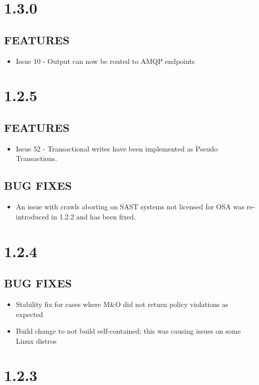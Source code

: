 \section{1.3.0}
\subsection*{FEATURES}
    \begin{itemize}
        \item Issue 10 - Output can now be routed to AMQP endpoints
    \end{itemize}


\section{1.2.5}
\subsection*{FEATURES}
    \begin{itemize}
        \item Issue 52 - Transactional writes have been implemented as Pseudo Transactions.
    \end{itemize}

\subsection*{BUG FIXES}
    \begin{itemize}
        \item An issue with crawls aborting on SAST systems not licensed for OSA was re-introduced in 1.2.2 and has been fixed.
    \end{itemize}

\section{1.2.4}
\subsection*{BUG FIXES}
    \begin{itemize}
        \item Stability fix for cases where M\&O did not return policy violations as expected
        \item Build change to not build self-contained; this was causing issues on some Linux distros
    \end{itemize}


\section{1.2.3}
